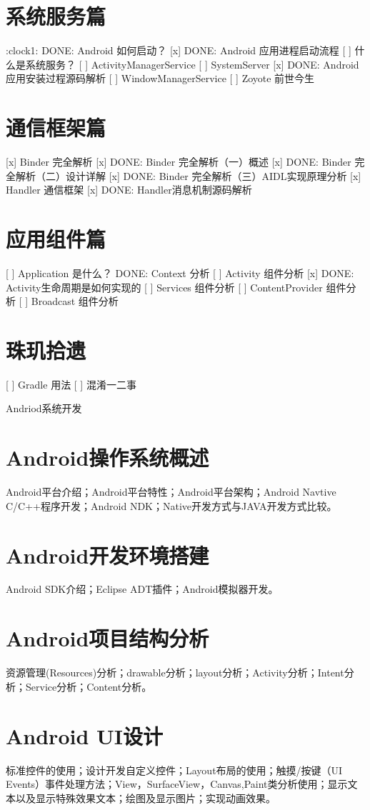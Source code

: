\documentclass[9pt, b5paper]{article}
\begin{document}
\section{系统服务篇}
\label{sec-3}
:clock1: DONE: Android 如何启动？
[x] DONE: Android 应用进程启动流程
[ ] 什么是系统服务？
[ ] ActivityManagerService
[ ] SystemServer
[x] DONE: Android 应用安装过程源码解析
[ ] WindowManagerService
[ ] Zoyote 前世今生

\section{通信框架篇}
\label{sec-4}
[x] Binder 完全解析
[x] DONE: Binder 完全解析（一）概述
[x] DONE: Binder 完全解析（二）设计详解
[x] DONE: Binder 完全解析（三）AIDL实现原理分析
[x] Handler 通信框架
[x] DONE: Handler消息机制源码解析

\section{应用组件篇}
\label{sec-5}
[ ] Application 是什么？
DONE: Context 分析
[ ] Activity 组件分析
[x] DONE: Activity生命周期是如何实现的
[ ] Services 组件分析
[ ] ContentProvider 组件分析
[ ] Broadcast 组件分析

\section{珠玑拾遗}
\label{sec-6}
[ ] Gradle 用法
[ ] 混淆一二事

Andriod系统开发

\section{Android操作系统概述}
\label{sec-7}
Android平台介绍；Android平台特性；Android平台架构；Android Navtive C/C++程序开发；Android NDK；Native开发方式与JAVA开发方式比较。
\section{Android开发环境搭建}
\label{sec-8}
Android SDK介绍；Eclipse ADT插件；Android模拟器开发。
\section{Android项目结构分析}
\label{sec-9}
资源管理(Resources)分析；drawable分析；layout分析；Activity分析；Intent分析；Service分析；Content分析。
\section{Android UI设计}
\label{sec-10}
标准控件的使用；设计开发自定义控件；Layout布局的使用；触摸/按键（UI Events）事件处理方法；View，SurfaceView，Canvas,Paint类分析使用；显示文本以及显示特殊效果文本；绘图及显示图片；实现动画效果。
\end{document}
